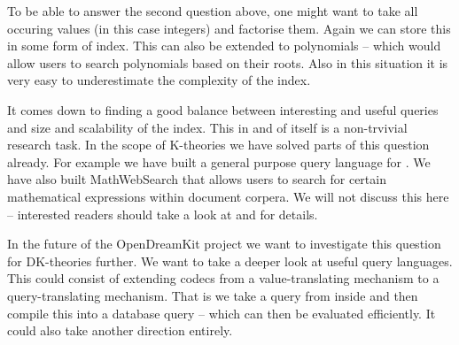 To be able to answer the second question above, one might want to take all occuring values
(in this case integers) and factorise them. Again we can store this in some form of
index. This can also be extended to polynomials -- which would allow users to search
polynomials based on their roots. Also in this situation it is very easy to underestimate
the complexity of the index.

It comes down to finding a good balance between interesting and useful queries and size
and scalability of the index. This in and of itself is a non-trvivial research task. In
the scope of K-theories we have solved parts of this question already. For example we have
built a general purpose query language for \MMT. We have also built MathWebSearch that
allows users to search for certain mathematical expressions within document corpera. We
will not discuss this here -- interested readers should take a look at \cite{Rabe:qlfml12}
and \cite{ODK-D6.1} for details.

In the future of the OpenDreamKit project we want to investigate this question for
DK-theories further. We want to take a deeper look at useful query languages. This could
consist of extending codecs from a value-translating mechanism to a query-translating
mechanism. That is we take a query from inside \MMT and then compile this into a database
query -- which can then be evaluated efficiently. It could also take another direction
entirely.

